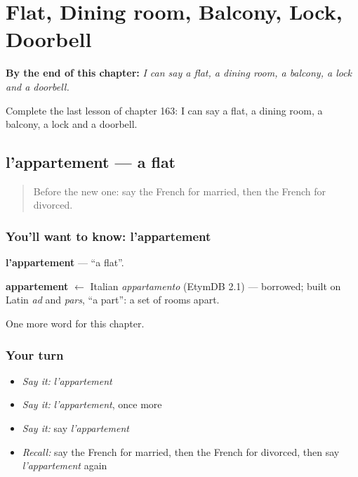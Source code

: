 
\chapter{Flat, Dining room, Balcony, Lock, Doorbell}
\label{ch:fr-flat-dining-room-balcony-lock-doorbell}

\begin{chapteropening}
\textbf{By the end of this chapter:} \emph{I can say a flat, a dining room, a balcony, a lock and a doorbell.}

Complete the last lesson of chapter 163: I can say a flat, a dining room, a balcony, a lock and a doorbell.
\end{chapteropening}

\section[l'appartement]{l'appartement — a flat}

\label{lesson:FR-C163-appartement}



\begin{quote}
Before the new one: say the French for married, then the French for divorced.
\end{quote}

\subsection*{You'll want to know: l'appartement}
\textbf{l'appartement} — \textquotedblleft{}a flat\textquotedblright{}.

\begin{cousinweb}
\textbf{appartement} $\leftarrow$ Italian \emph{appartamento} (EtymDB 2.1) — borrowed; built on Latin \emph{ad} and \emph{pars}, \textquotedblleft{}a part\textquotedblright{}: a set of rooms apart.
\end{cousinweb}

\begin{grammarlens}[title={What you've built}]
One more word for this chapter.
\end{grammarlens}

\subsection*{Your turn}
\begin{itemize}
\raggedright
  \item \emph{Say it:} \emph{l'appartement}
  \item \emph{Say it:} \emph{l'appartement}, once more
  \item \emph{Say it:} say \emph{l'appartement}
  \item \emph{Recall:} say the French for married, then the French for divorced, then say \emph{l'appartement} again
\end{itemize}

